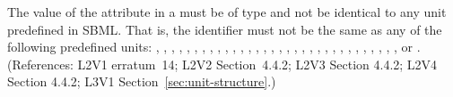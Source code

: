 The value of the  attribute in a \UnitDefinition must be of
type  and not be
identical to any unit predefined in SBML.  That is, the identifier
must not be the same as any of the following predefined units:
,
,
,
,
,
,
,
,
,
,
,
,
,
,
,
,
,
,
,
,
,
,
,
,
,
,
,
,
,
,
,
, or
.
(References: L2V1 erratum~14; L2V2 Section~4.4.2; L2V3 Section 4.4.2;
 L2V4 Section 4.4.2; L3V1 Section~\ref{sec:unit-structure}.)
